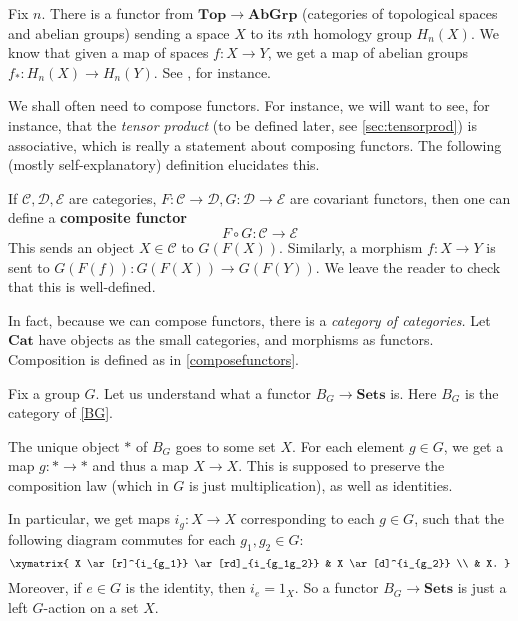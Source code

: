 \begin{example}
Fix $n$.
There is a functor from $\mathbf{Top} \to \mathbf{AbGrp}$
(categories of topological spaces and abelian groups) sending a
space $X$ to its  $n$th homology group $H_n(X)$. We know that given a map of spaces
$f: X \to Y$,
we get a map of abelian groups $f_*: H_n(X) \to H_n(Y)$. See \cite{Ha02}, for
instance.
\end{example}

We shall often need to compose functors. For instance, we will want to see, for
instance, that the \emph{tensor product} (to be defined later, see
\cref{sec:tensorprod}) is
associative, which is really a statement about composing functors. The
following (mostly self-explanatory) definition elucidates this.

\begin{definition}\label{composefunctors}
If $\mathcal{C}, \mathcal{D}, \mathcal{E}$ are categories, $F: \mathcal{C} \to
\mathcal{D}, G: \mathcal{D} \to \mathcal{E}$ are covariant functors, then one
can define a \textbf{composite functor}
\[ F \circ G: \mathcal{C}  \to \mathcal{E}  \]
This sends an object $X \in \mathcal{C}$ to $G(F(X))$.
Similarly, a morphism $f :X \to Y$ is sent to $G(F(f)): G(F(X)) \to G(F(Y))$.
We leave the reader to check that this is well-defined.
\end{definition}




\begin{example}\label{categoryofcats}
In fact, because we can compose functors, there is a \emph{category of
categories.} Let $\mathbf{Cat}$ have objects as the small categories, and
morphisms as functors. Composition is defined as in \cref{composefunctors}.
\end{example}


\begin{example} \label{groupact} Fix a group $G$. 
Let us understand what  a functor $B_G \stackrel{}{\to} \mathbf{Sets}$ is. Here $B_G$ is the
category  of \cref{BG}.

The unique object $\ast$ of $B_G$ goes to some set $X$. For each element $g \in G$, we
get a map $g: \ast \to \ast$ and thus a map $X \to X$. This is supposed to
preserve the composition law (which in $G$ is just multiplication), as well as
identities.

In particular, we get maps $i_g: X \to X$ corresponding to each $g \in G$, such
that the following diagram commutes for each $g_1, g_2 \in G$:
\[ \xymatrix{
X \ar[r]^{i_{g_1}} \ar[rd]_{i_{g_1g_2}} & X \ar[d]^{i_{g_2}} \\ & X.
}\]
Moreover, if $e \in G$ is the identity, then $i_e = 1_X$.
So a functor $B_G \to \mathbf{Sets}$ is just a left $G$-action on a set $X$.
\end{example}



